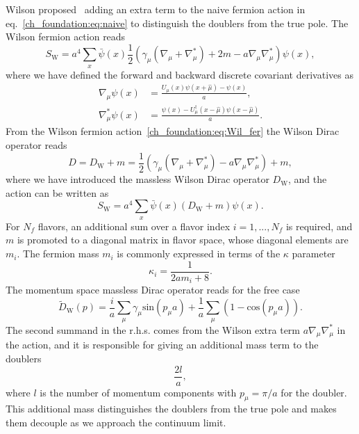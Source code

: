 Wilson proposed~\citep{Wilson:1974sk} adding an extra term to the naive fermion action in eq.~\eqref{ch_foundation:eq:naive} to distinguish the doublers from the true pole. The Wilson fermion action reads
\begin{equation}
\label{ch_foundation:eq:Wil_fer}
S_{\textrm{W}}=a^4\sum_x\bar{\psi}(x)\frac{1}{2}\left(\gamma_{\mu}\left(\nabla_{\mu}+\nabla_{\mu}^*\right)+2m-a\nabla_{\mu}\nabla_{\mu}^*\right)\psi(x),
\end{equation}
where we have defined the forward and backward discrete covariant derivatives as
\begin{align}
\nabla_{\mu}\psi(x)&=\frac{U_{\mu}(x)\psi(x+\hat{\mu})-\psi(x)}{a},\\
\nabla_{\mu}^*\psi(x)&=\frac{\psi(x)-U_{\mu}^{\dagger}(x-\hat{\mu})\psi(x-\hat{\mu})}{a}.
\end{align}
From the Wilson fermion action~\eqref{ch_foundation:eq:Wil_fer} the Wilson Dirac operator reads
\begin{equation}
\label{ch_foundation:eq:DW}
D=D_{\textrm{W}}+m=\frac{1}{2}\left(\gamma_{\mu}\left(\nabla_{\mu}+\nabla_{\mu}^*\right)-a\nabla_{\mu}\nabla_{\mu}^*\right)+m,
\end{equation}
where we have introduced the massless Wilson Dirac operator $D_{\textrm{W}}$, and the action can be written as
\begin{equation}
S_{\textrm{W}}=a^4\sum_x\bar{\psi}(x)\left(D_{\textrm{W}}+m\right)\psi(x).
\end{equation}
For $N_f$ flavors, an additional sum over a flavor index $i=1,...,N_f$ is required, and $m$ is promoted to a diagonal matrix in flavor space, whose diagonal elements are $m_i$. The fermion mass $m_i$ is commonly expressed in terms of the $\kappa$ parameter
\begin{equation}
\label{ch_foundation:eq:kappa}
\kappa_i=\frac{1}{2am_i+8}.
\end{equation}
The momentum space massless Dirac operator reads for the free case
\begin{equation}
\tilde{D}_{\textrm{W}}(p)=\frac{i}{a}\sum_{\mu}\gamma_{\mu}\textrm{sin}(p_{\mu}a)+\frac{1}{a}\sum_{\mu}\left(1-\textrm{cos}(p_{\mu}a)\right).
\end{equation}
The second summand in the r.h.s. comes from the Wilson extra term $a\nabla_{\mu}\nabla_{\mu}^*$ in the action, and it is responsible for giving an additional mass term to the doublers
\begin{equation}
\frac{2l}{a},
\end{equation}
where $l$ is the number of momentum components with $p_{\mu}=\pi/a$ for the doubler. This additional mass distinguishes the doublers from the true pole and makes them decouple as we approach the continuum limit.

